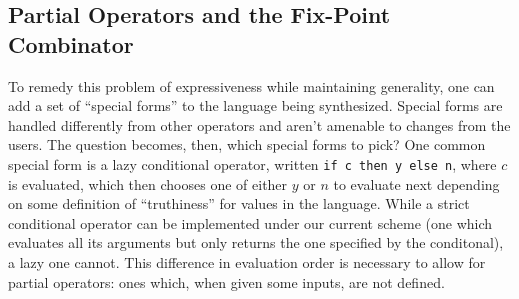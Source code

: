 \documentclass[acmsmall]{acmart}
\begin{document}



\subsection{Partial Operators and the Fix-Point Combinator}

To remedy this problem of expressiveness while maintaining generality, one can add a set of ``special forms'' to the language being synthesized. Special forms are handled differently from other operators and aren't amenable to changes from the users. The question becomes, then, which special forms to pick? One common special form is a lazy conditional operator, written \verb|if c then y else n|, where $c$ is evaluated, which then chooses one of either $y$ or $n$ to evaluate next depending on some definition of ``truthiness'' for values in the language. While a strict conditional operator can be implemented under our current scheme (one which evaluates all its arguments but only returns the one specified by the conditonal), a lazy one cannot. This difference in evaluation order is necessary to allow for partial operators: ones which, when given some inputs, are not defined.
\end{document}
